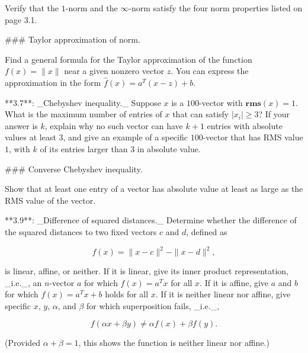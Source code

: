Verify that the \(1\)-norm and the \(\infty\)-norm satisfy the four norm properties listed on page 3.1.

### Taylor approximation of norm.

Find a general formula for the Taylor approximation of the function \(f(x)=\|x\|\) near a given nonzero vector \(z\). You can express the approximation in the form \(\hat{f}(x)=a^{T}(x-z)+b\).

**3.7**: _Chebyshev inequality._ Suppose \(x\) is a \(100\)-vector with \(\mathbf{rms}(x)=1\). What is the maximum number of entries of \(x\) that can satisfy \(|x_{i}|\geq 3\)? If your answer is \(k\), explain why no such vector can have \(k+1\) entries with absolute values at least \(3\), and give an example of a specific \(100\)-vector that has RMS value \(1\), with \(k\) of its entries larger than \(3\) in absolute value.

### Converse Chebyshev inequality.

Show that at least one entry of a vector has absolute value at least as large as the RMS value of the vector.

**3.9**: _Difference of squared distances._ Determine whether the difference of the squared distances to two fixed vectors \(c\) and \(d\), defined as

\[f(x)=\|x-c\|^{2}-\|x-d\|^{2},\]

is linear, affine, or neither. If it is linear, give its inner product representation, _i.e._, an \(n\)-vector \(a\) for which \(f(x)=a^{T}x\) for all \(x\). If it is affine, give \(a\) and \(b\) for which \(f(x)=a^{T}x+b\) holds for all \(x\). If it is neither linear nor affine, give specific \(x\), \(y\), \(\alpha\), and \(\beta\) for which superposition fails, _i.e._,

\[f(\alpha x+\beta y)\neq\alpha f(x)+\beta f(y).\]

(Provided \(\alpha+\beta=1\), this shows the function is neither linear nor affine.)